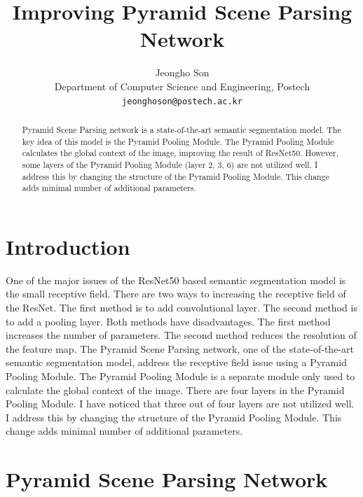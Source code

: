 \documentclass[10pt,twocolumn,letterpaper]{article}
\begin{document}
\title{Improving Pyramid Scene Parsing Network}

\author{
  Jeongho Son\\
  Department of Computer Science and Engineering, Postech\\
  {\tt\small jeonghoson@postech.ac.kr}
}

\maketitle

\begin{abstract}
  Pyramid Scene Parsing network\cite{zhao2017pyramid} is a state-of-the-art semantic segmentation model. The key idea of this model is the Pyramid Pooling Module. The Pyramid Pooling Module calculates the global context of the image, improving the result of ResNet50\cite{he2015deep}. However, some layers of the Pyramid Pooling Module (layer 2, 3, 6) are not utilized well. I address this by changing the structure of the Pyramid Pooling Module. This change adds minimal number of additional parameters.
\end{abstract}

\section{Introduction}
\label{sec:intro}

One of the major issues of the ResNet50 based semantic segmentation model is the small receptive field. There are two ways to increasing the receptive field of the ResNet. The first method is to add convolutional layer. The second method is to add a pooling layer. Both methods have disadvantages. The first method increases the number of parameters. The second method reduces the resolution of the feature map. The Pyramid Scene Parsing network\cite{zhao2017pyramid}, one of the state-of-the-art semantic segmentation model, address the receptive field issue using a Pyramid Pooling Module. The Pyramid Pooling Module is a separate module only used to calculate the global context of the image. There are four layers in the Pyramid Pooling Module. I have noticed that three out of four layers are not utilized well. I address this by changing the structure of the Pyramid Pooling Module. This change adds minimal number of additional parameters.

\section{Pyramid Scene Parsing Network}
\label{sec:PSPNet}
\end{document}
